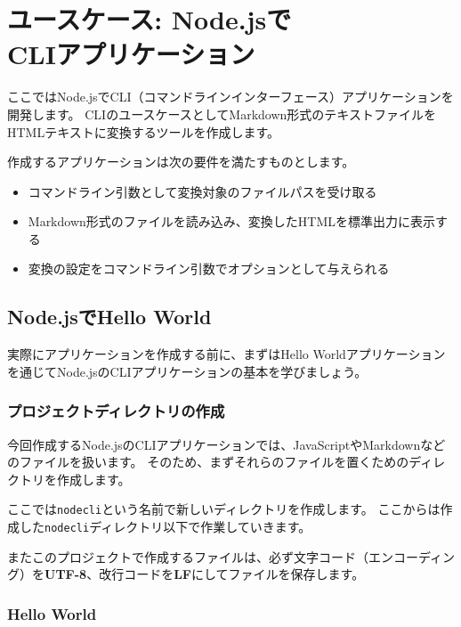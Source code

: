 \hypertarget{node-cli}{%
\chapter[ユースケース: Node.jsでCLIアプリケーション]{ユースケース: Node.jsで\\CLIアプリケーション}\label{node-cli}}
\thispagestyle{frontheadings}

ここではNode.jsでCLI（コマンドラインインターフェース）アプリケーションを開発します。
CLIのユースケースとしてMarkdown形式のテキストファイルをHTMLテキストに変換するツールを作成します。

作成するアプリケーションは次の要件を満たすものとします。

\begin{itemize}
\item
  コマンドライン引数として変換対象のファイルパスを受け取る
\item
  Markdown形式のファイルを読み込み、変換したHTMLを標準出力に表示する
\item
  変換の設定をコマンドライン引数でオプションとして与えられる
\end{itemize}

\hypertarget{hello-world-by-nodejs}{%
\section{Node.jsでHello World}\label{hello-world-by-nodejs}}

実際にアプリケーションを作成する前に、まずはHello
Worldアプリケーションを通じてNode.jsのCLIアプリケーションの基本を学びましょう。

\hypertarget{create-project}{%
\subsection{プロジェクトディレクトリの作成}\label{create-project}}

今回作成するNode.jsのCLIアプリケーションでは、JavaScriptやMarkdownなどのファイルを扱います。
そのため、まずそれらのファイルを置くためのディレクトリを作成します。

ここでは\texttt{nodecli}という名前で新しいディレクトリを作成します。
ここからは作成した\texttt{nodecli}ディレクトリ以下で作業していきます。

またこのプロジェクトで作成するファイルは、必ず文字コード（エンコーディング）を\textbf{UTF-8}、改行コードを\textbf{LF}にしてファイルを保存します。

\hypertarget{hello-world}{%
\subsection{Hello World}\label{hello-world}}

